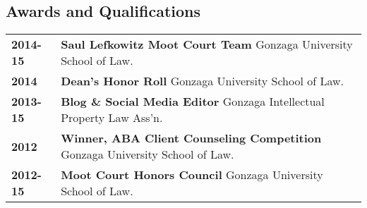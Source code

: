 \documentclass[letter, 11pt, oneside]{article}
\begin{document}
\begin{center}

\section{Awards and Qualifications} 

\begin{tabularx}{1\linewidth}{>{\raggedleft\scshape}p{3cm}X}
\textbf{2014-15}	&  \textbf{Saul Lefkowitz Moot Court Team} Gonzaga University School of Law. \\
\textbf{2014}	&  \textbf{Dean's Honor Roll} Gonzaga University School of Law. \\
\textbf{2013-15}	&  \textbf{Blog \& Social Media Editor} Gonzaga Intellectual Property Law Ass'n. \\
\textbf{2012}    &  \textbf{Winner, ABA Client Counseling Competition} Gonzaga University School of Law. \\
\textbf{2012-15}    &  \textbf{Moot Court Honors Council} Gonzaga University School of Law. \\
\end{tabularx}


\end{center}
\end{document}
